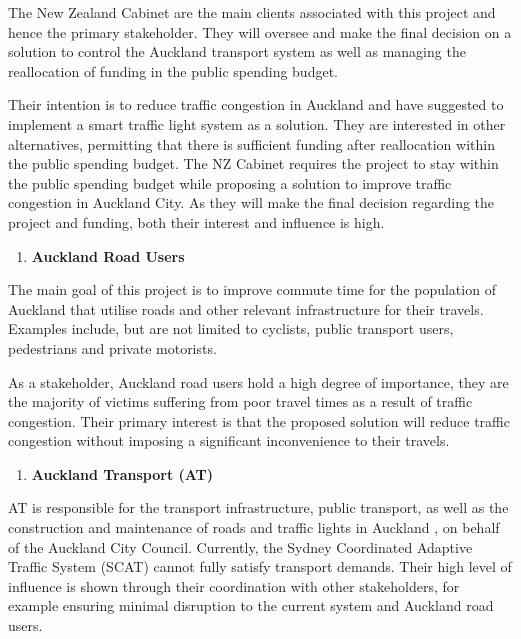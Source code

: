 \documentclass[twoside, a4paper, 11pt]{article}
\begin{document}
The New Zealand Cabinet are the main clients associated with this project and hence the primary stakeholder. They will oversee and make the final decision on a solution to control the Auckland transport system as well as managing the reallocation of funding in the public spending budget.

Their intention is to reduce traffic congestion in Auckland and have suggested to implement a smart traffic light system as a solution. They are interested in other alternatives, permitting that there is sufficient funding after reallocation within the public spending budget. The NZ Cabinet requires the project to stay within the public spending budget while proposing a solution to improve traffic congestion in Auckland City. As they will make the final decision regarding the project and funding, both their interest and influence is high.

\begin{enumerate}[label=\textbf{\arabic*}),leftmargin=0in,resume]
\item \textbf{Auckland Road Users}
\end{enumerate}

The main goal of this project is to improve commute time for the population of Auckland that utilise roads and other relevant infrastructure for their travels. Examples include, but are not limited to cyclists, public transport users, pedestrians and private motorists. 

As a stakeholder, Auckland road users hold a high degree of importance, they are the majority of victims suffering from poor travel times as a result of traffic congestion. Their primary interest is that the proposed solution will reduce traffic congestion without imposing a significant inconvenience to their travels.

\begin{enumerate}[label=\textbf{\arabic*}),leftmargin=0in,resume]
\item \textbf{Auckland Transport (AT)}
\end{enumerate}

AT is responsible for the transport infrastructure, public transport, as well as the construction and maintenance of roads and traffic lights in Auckland \citep{ATND_2}, on behalf of the Auckland City Council. Currently, the Sydney Coordinated Adaptive Traffic System (SCAT) cannot fully satisfy transport demands. Their high level of influence is shown through their coordination with other stakeholders, for example ensuring minimal disruption to the current system and Auckland road users. 
\end{document}
